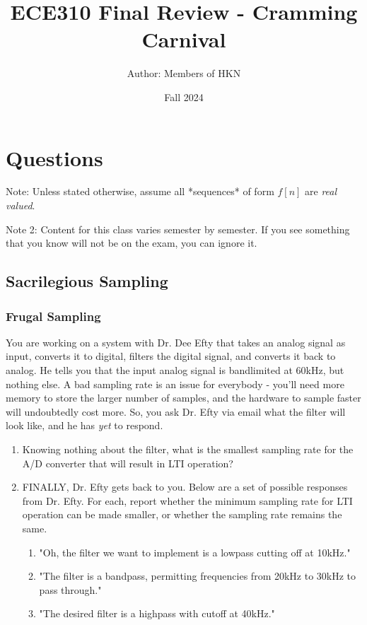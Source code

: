\documentclass{article}
\title{ECE310 Final Review - Cramming Carnival}
\author{Author: Members of HKN}
\date{Fall 2024}
\begin{document}
\maketitle

\section{Questions}
Note: Unless stated otherwise, assume all *sequences* of form $f[n]$ are \textit{real valued}.

Note 2: Content for this class varies semester by semester. If you see something that you know will not be on the exam, you can ignore it.
\subsection{Sacrilegious Sampling}
\subsubsection{Frugal Sampling}
You are working on a system with Dr. Dee Efty that takes an analog signal as input, converts it to digital, filters the digital signal, and converts it back to analog. He tells you that the input analog signal is bandlimited at 60kHz, but nothing else. A bad sampling rate is an issue for everybody - you'll need more memory to store the larger number of samples, and the hardware to sample faster will undoubtedly cost more. So, you ask Dr. Efty via email what the filter will look like, and he has \textit{yet} to respond.

\begin{enumerate}
    \item Knowing nothing about the filter, what is the smallest sampling rate for the A/D converter that will result in LTI operation? \vspace{1.5cm}
    \item FINALLY, Dr. Efty gets back to you. Below are a set of possible responses from Dr. Efty. For each, report whether the minimum sampling rate for LTI operation can be made smaller, or whether the sampling rate remains the same.
    \begin{enumerate}
        \item "Oh, the filter we want to implement is a lowpass cutting off at 10kHz." \vspace{1.5cm}
        \item "The filter is a bandpass, permitting frequencies from 20kHz to 30kHz to pass through." \vspace{1.5cm}
        \item "The desired filter is a highpass with cutoff at 40kHz." \vspace{1.5cm}

    \end{enumerate}
\end{enumerate}
\end{document}
